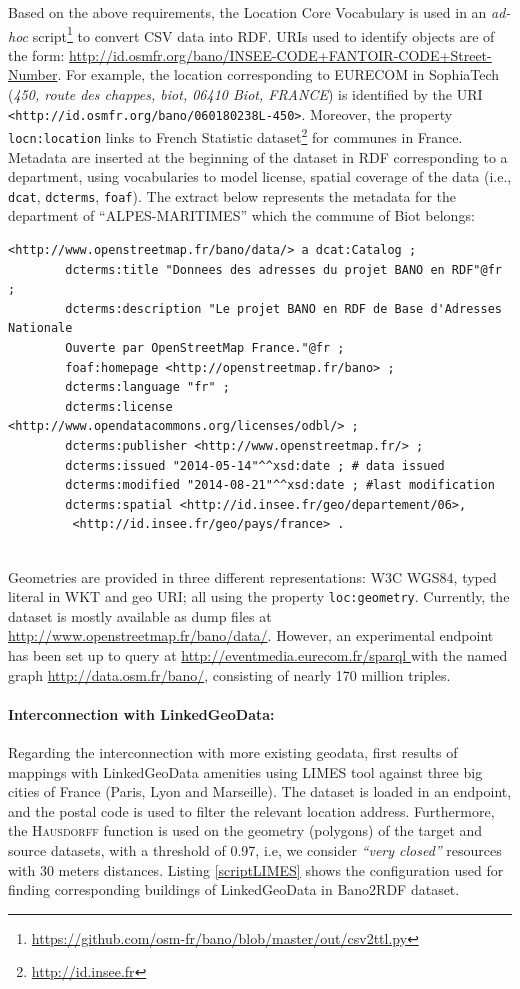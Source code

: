 Based on the above requirements, the Location Core Vocabulary \cite{locnvocab} is used in an \textit{ad-hoc} script\footnote{\url{https://github.com/osm-fr/bano/blob/master/out/csv2ttl.py}} to convert CSV data into RDF. URIs used to identify objects are of the form: \url{http://id.osmfr.org/bano/INSEE-CODE+FANTOIR-CODE+Street-Number}. For example, the location corresponding to EURECOM in SophiaTech (\textit{450, route des chappes, biot, 06410 Biot, FRANCE}) is identified by the URI \\
\texttt{<http://id.osmfr.org/bano/060180238L-450>}. Moreover, the property \\ \texttt{locn:location} links to French Statistic dataset\footnote{\url{http://id.insee.fr}} for communes in France. Metadata are inserted at the beginning of the dataset in RDF corresponding to a department, using vocabularies to model license, spatial coverage of the data (i.e., \texttt{dcat}, \texttt{dcterms}, \texttt{foaf}). The extract below represents the metadata for the department of ``ALPES-MARITIMES'' which the commune of Biot belongs:

\begin{verbatim}
<http://www.openstreetmap.fr/bano/data/> a dcat:Catalog ;
		dcterms:title "Donnees des adresses du projet BANO en RDF"@fr ;
		dcterms:description "Le projet BANO en RDF de Base d'Adresses Nationale
		Ouverte par OpenStreetMap France."@fr ;
		foaf:homepage <http://openstreetmap.fr/bano> ;
		dcterms:language "fr" ;
		dcterms:license <http://www.opendatacommons.org/licenses/odbl/> ;
		dcterms:publisher <http://www.openstreetmap.fr/> ;
		dcterms:issued "2014-05-14"^^xsd:date ; # data issued
		dcterms:modified "2014-08-21"^^xsd:date ; #last modification
		dcterms:spatial <http://id.insee.fr/geo/departement/06>,
		 <http://id.insee.fr/geo/pays/france> .
		
\end{verbatim}

Geometries are provided in three different representations: W3C WGS84, typed literal in WKT and geo URI; all using the property \texttt{loc:geometry}. Currently, the dataset is mostly available as dump files at \url{http://www.openstreetmap.fr/bano/data/}. However, an experimental endpoint has been set up to query at \url{http://eventmedia.eurecom.fr/sparql } with the named graph \url{http://data.osm.fr/bano/}, consisting of nearly 170 million triples.

\paragraph{Interconnection with LinkedGeoData:}
Regarding the interconnection with more existing geodata, first results of mappings with LinkedGeoData amenities using LIMES tool against three big cities of France (Paris, Lyon and Marseille). The dataset is loaded in an endpoint, and the postal code is used to filter the relevant location address. Furthermore, the \textsc{Hausdorff} function is used on the geometry (polygons) of the target and source datasets, with a threshold of 0.97, i.e, we consider \textit{``very closed''} resources with 30 meters distances. Listing \ref{scriptLIMES} shows the configuration used for finding corresponding buildings of LinkedGeoData in Bano2RDF dataset.

